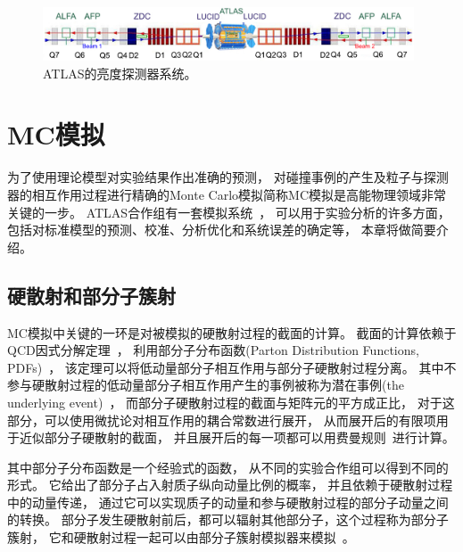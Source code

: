 \begin{figure}
  \begin{center}
    \includegraphics[width=0.98\textwidth]{figuresEXP/ATLASLD1.jpg}
  \end{center}
  \caption{
ATLAS的亮度探测器系统。
  }
    \label{fig:ATLASLD1}
\end{figure}


\section{MC模拟}
\label{sec:Simulation}

为了使用理论模型对实验结果作出准确的预测，
对碰撞事例的产生及粒子与探测器的相互作用过程进行精确的Monte Carlo模拟简称MC模拟是高能物理领域非常关键的一步。
ATLAS合作组有一套模拟系统~\cite{ATLASMC}，
可以用于实验分析的许多方面，包括对标准模型的预测、校准、分析优化和系统误差的确定等，
本章将做简要介绍。

\subsection{硬散射和部分子簇射}
\label{sec:MCHS}

MC模拟中关键的一环是对被模拟的硬散射过程的截面的计算。
截面的计算依赖于QCD因式分解定理~\cite{MC1}，
利用部分子分布函数(Parton Distribution Functions, PDFs)~\cite{MC2}，
该定理可以将低动量部分子相互作用与部分子硬散射过程分离。
其中不参与硬散射过程的低动量部分子相互作用产生的事例被称为潜在事例(the underlying event)~\cite{MC3}，
而部分子硬散射过程的截面与矩阵元的平方成正比，
对于这部分，可以使用微扰论对相互作用的耦合常数进行展开，
从而展开后的有限项用于近似部分子硬散射的截面，
并且展开后的每一项都可以用费曼规则~\cite{FEYNR}进行计算。

其中部分子分布函数是一个经验式的函数，
从不同的实验合作组可以得到不同的形式。
它给出了部分子占入射质子纵向动量比例的概率，
并且依赖于硬散射过程中的动量传递，
通过它可以实现质子的动量和参与硬散射过程的部分子动量之间的转换。
部分子发生硬散射前后，都可以辐射其他部分子，这个过程称为部分子簇射，
它和硬散射过程一起可以由部分子簇射模拟器来模拟~\cite{MC6}。


